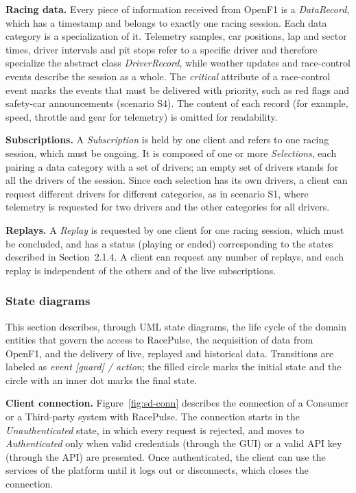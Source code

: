 \documentclass[11pt,a4paper]{article}
\newcommand{\RP}{RacePulse}
\begin{document}
\textbf{Racing data.} Every piece of information received from OpenF1 is a \emph{DataRecord}, which has a
timestamp and belongs to exactly one racing session. Each data category is a specialization of it. Telemetry
samples, car positions, lap and sector times, driver intervals and pit stops refer to a specific driver and
therefore specialize the abstract class \emph{DriverRecord}, while weather updates and race-control events
describe the session as a whole. The \emph{critical} attribute of a race-control event marks the events that must
be delivered with priority, such as red flags and safety-car announcements (scenario S4). The content of each
record (for example, speed, throttle and gear for telemetry) is omitted for readability.

\textbf{Subscriptions.} A \emph{Subscription} is held by one client and refers to one racing session, which must be
ongoing. It is composed of one or more \emph{Selections}, each pairing a data category with a set of drivers; an
empty set of drivers stands for all the drivers of the session. Since each selection has its own drivers, a
client can request different drivers for different categories, as in scenario S1, where telemetry is requested
for two drivers and the other categories for all drivers.

\textbf{Replays.} A \emph{Replay} is requested by one client for one racing session, which must be concluded, and
has a status (playing or ended) corresponding to the states described in Section~2.1.4. A client can request any
number of replays, and each replay is independent of the others and of the live subscriptions.

\subsubsection{State diagrams}
This section describes, through UML state diagrams, the life cycle of the domain entities that govern the access
to \RP{}, the acquisition of data from OpenF1, and the delivery of live, replayed and historical data. Transitions are labeled as \emph{event [guard] / action}; the filled circle
marks the initial state and the circle with an inner dot marks the final state.

\textbf{Client connection.} Figure~\ref{fig:sd-conn} describes the connection of a Consumer or a Third-party system
with \RP{}. The connection starts in the \emph{Unauthenticated} state, in which every request is rejected, and
moves to \emph{Authenticated} only when valid credentials (through the GUI) or a valid API key (through the API)
are presented. Once authenticated, the client can use the services of the platform until it logs out or
disconnects, which closes the connection.
\end{document}
